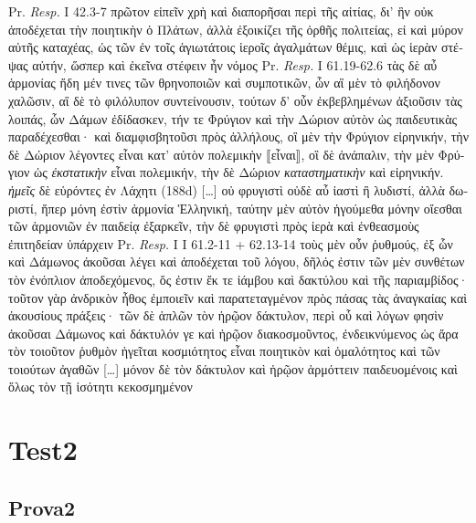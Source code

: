 \documentclass[11pt,a4paper]{book}
\begin{document}
\begin{small}
\begin{pairs}
    \begin{Rightside}
    \beginnumbering
    \pstart
    \noindent Pr. \textit{Resp.} I 42.3-7 \textgreek{πρῶτον εἰπεῖν χρὴ καὶ διαπορῆσαι περὶ τῆς αἰτίας, δι’ ἣν οὐκ ἀποδέχεται τὴν ποιητικὴν ὁ Πλάτων, ἀλλὰ ἐξοικίζει τῆς ὀρθῆς πολιτείας, εἰ καὶ μύρον αὐτῆς καταχέας, ὡς τῶν ἐν τοῖς ἁγιωτάτοις ἱεροῖς ἀγαλμάτων θέμις, καὶ ὡς ἱερὰν στέψας αὐτήν, ὥσπερ καὶ ἐκεῖνα στέφειν ἦν νόμος}
    \pend
    \pstart
    \noindent Pr. \textit{Resp.} I 61.19-62.6 \textgreek{τὰς δὲ αὖ ἁρμονίας ἤδη μέν τινες τῶν θρηνοποιῶν καὶ συμποτικῶν, ὧν αἳ μὲν τὸ φιλήδονον χαλῶσιν, αἳ δὲ τὸ φιλόλυπον συντείνουσιν, τούτων δ’ οὖν ἐκβεβλημένων ἀξιοῦσιν τὰς λοιπάς, ὧν Δάμων ἐδίδασκεν, τήν τε Φρύγιον καὶ τὴν Δώριον αὐτὸν ὡς παιδευτικὰς παραδέχεσθαι· καὶ διαμφισβητοῦσι πρὸς ἀλλήλους, οἳ μὲν τὴν Φρύγιον εἰρηνικήν, τὴν δὲ Δώριον λέγοντες εἶναι κατ’ αὐτὸν πολεμικὴν ⟦εἶναι⟧, οἳ δὲ ἀνάπαλιν, τὴν μὲν Φρύγιον ὡς \textit{ἐκστατικὴν} εἶναι πολεμικήν, τὴν δὲ Δώριον \textit{καταστηματικὴν} καὶ εἰρηνικήν. \textit{ἡμεῖς} δὲ εὑρόντες ἐν Λάχητι (188d) […] οὐ φρυγιστὶ οὐδὲ αὖ ἰαστὶ ἢ λυδιστί, ἀλλὰ δωριστί, ἥπερ μόνη ἐστὶν ἁρμονία Ἑλληνική, ταύτην μὲν αὐτὸν ἡγούμεθα μόνην οἴεσθαι τῶν ἁρμονιῶν ἐν παιδείᾳ ἐξαρκεῖν, τὴν δὲ φρυγιστὶ πρὸς ἱερὰ καὶ ἐνθεασμοὺς ἐπιτηδείαν ὑπάρχειν}
    \pend
    \pstart
    \noindent Pr. \textit{Resp.} I I 61.2-11 + 62.13-14 \textgreek{τοὺς μὲν οὖν ῥυθμούς, ἐξ ὧν καὶ Δάμωνος ἀκοῦσαι λέγει καὶ ἀποδέχεται τοῦ λόγου, δῆλός ἐστιν τῶν μὲν συνθέτων τὸν ἐνόπλιον ἀποδεχόμενος, ὅς ἐστιν ἔκ τε ἰάμβου καὶ δακτύλου καὶ τῆς παριαμβίδος· τοῦτον γὰρ ἀνδρικὸν ἦθος ἐμποιεῖν καὶ παρατεταγμένον πρὸς πάσας τὰς ἀναγκαίας καὶ ἀκουσίους πράξεις· τῶν δὲ ἁπλῶν τὸν ἡρῷον δάκτυλον, περὶ οὗ καὶ λόγων φησὶν ἀκοῦσαι Δάμωνος καὶ δάκτυλόν γε καὶ ἡρῷον διακοσμοῦντος, ἐνδεικνύμενος ὡς ἄρα τὸν τοιοῦτον ῥυθμὸν ἡγεῖται κοσμιότητος εἶναι ποιητικὸν καὶ ὁμαλότητος καὶ τῶν τοιούτων ἀγαθῶν […] μόνον δὲ τὸν δάκτυλον καὶ ἡρῷον ἁρμόττειν παιδευομένοις καὶ ὅλως τὸν τῇ ἰσότητι κεκοσμημένον}
    \pend
    \endnumbering
    \end{Rightside}
\end{pairs}
\Columns
\numberlinetrue
\end{small}

\chapter{Test2}
\section{Prova2}
\end{document}
